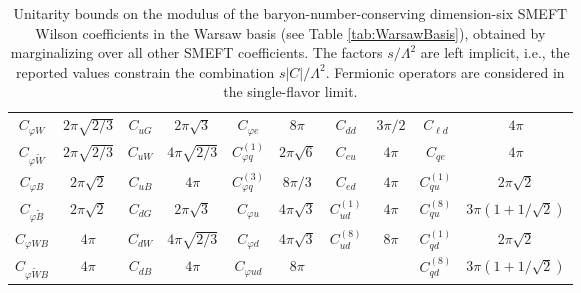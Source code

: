 \begin{table}[htbp]
{\begin{tabular}{c|c|c|c|c|c|c|c|c|c}
         $C_{\varphi W}$ & $2\pi\sqrt{2/3}$ & $C_{uG}$ & $2\pi\sqrt{3}$ & $C_{\varphi e}$ & $8\pi$ & $C_{dd}$ & $3\pi/2$ & $C_{\ell d}$ & $4\pi$\\
         
         $C_{\varphi \widetilde W}$ & $2\pi\sqrt{2/3}$ & $C_{uW}$ & $4\pi\sqrt{2/3}$ & $C_{\varphi q}^{(1)}$ & $2\pi\sqrt{6}$ & $C_{eu}$ & $4\pi$ & $C_{q e}$ & $4\pi$ \\
         
        $C_{\varphi B}$ & $2\pi\sqrt{2}$ & $C_{uB}$ & $4\pi$ & $C_{\varphi q}^{(3)}$ & $8\pi/3$ & $C_{ed}$ & $4\pi$ & $C_{q u}^{(1)}$ & $2\pi\sqrt{2}$\\
        
        $C_{\varphi \widetilde B}$ & $2\pi\sqrt{2}$ & $C_{dG}$ & $2\pi\sqrt{3}$ & $C_{\varphi u}$ & $4\pi \sqrt{3}$ & $C_{ud}^{(1)}$ & $4\pi$ & $C_{q u}^{(8)}$ & $3\pi(1+1/\sqrt{2})$\\
        
        $C_{\varphi W B}$ & $4\pi$ & $C_{dW}$ & $4\pi\sqrt{2/3}$ & $C_{\varphi d}$ & $4\pi\sqrt{3}$ & $C_{ud}^{(8)}$ & $8\pi$ & $C_{qd}^{(1)}$ & $2\pi\sqrt{2}$\\
        
        $C_{\varphi \widetilde W B}$ & $4\pi$ & $C_{dB}$ & $4\pi$ & $C_{\varphi ud}$ & $8\pi$ & & & $C_{q d}^{(8)}$ & $3\pi(1+1/\sqrt{2})$ \\
        \bottomrule
    \end{tabular}
    }
    \caption{Unitarity bounds on the modulus of the baryon-number-conserving dimension-six SMEFT Wilson coefficients in the Warsaw basis \cite{Grzadkowski:2010es} (see Table \ref{tab:WarsawBasis}), obtained by marginalizing over all other SMEFT coefficients. The factors $s/\Lambda^2$ are left implicit, i.e., the reported values constrain the combination $s|C|/\Lambda^2$. Fermionic operators are considered in the single-flavor limit.}
    \label{tab:UniBounds}
\end{table}